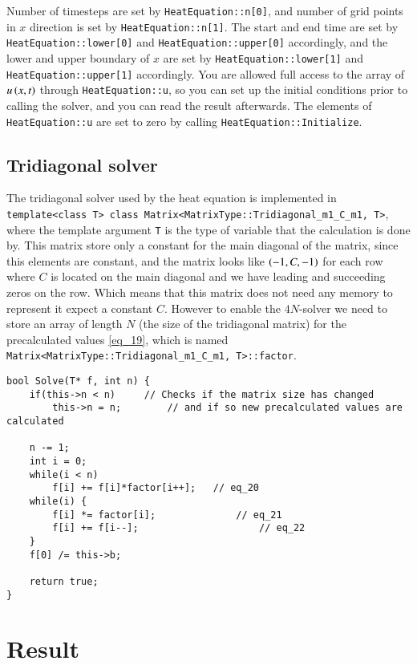 \documentclass[11pt,english,a4paper]{article}
\begin{document}
\begin{flushleft}
Number of timesteps are set by \texttt{HeatEquation::n[0]}, and number of grid points in $x$ direction is set by \texttt{HeatEquation::n[1]}. The start and end time are set by \texttt{HeatEquation::lower[0]} and \texttt{HeatEquation::upper[0]} accordingly, and the lower and upper boundary of $x$ are set by \texttt{HeatEquation::lower[1]} and \texttt{HeatEquation::upper[1]} accordingly. You are allowed full access to the array of $u\left({x,t}\right)$ through \texttt{HeatEquation::u}, so you can set up the initial conditions prior to calling the solver, and you can read the result afterwards. The elements of \texttt{HeatEquation::u}  are set to zero by calling \texttt{HeatEquation::Initialize}.

\subsection{Tridiagonal solver}

The tridiagonal solver used by the heat equation is implemented in \texttt{template<class T> class Matrix<MatrixType::Tridiagonal\_m1\_C\_m1, T>}, where the template argument \texttt{T} is the type of variable that the calculation is done by. This matrix store only a constant for the main diagonal of the matrix, since this elements are constant, and the matrix looks like $\left({-1,C,-1}\right)$ for each row where $C$ is located on the main diagonal and we have leading and succeeding zeros on the row. Which means that this matrix does not need any memory to represent it expect a constant $C$. However to enable the $4N$-solver we need to store an array of length $N$ (the size of the tridiagonal matrix) for the precalculated values \eqref{eq_19}, which is named \texttt{Matrix<MatrixType::Tridiagonal\_m1\_C\_m1, T>::factor}.

\begin{lstlisting}[title={\texttt{Matrix<MatrixType::Tridiagonal\_m1\_C\_m1, T>::Solve}}]
bool Solve(T* f, int n) {
	if(this->n < n)		// Checks if the matrix size has changed 
		this->n = n;		// and if so new precalculated values are calculated
	
	n -= 1;
	int i = 0;
	while(i < n)
		f[i] += f[i]*factor[i++];	// eq_20
	while(i) {
		f[i] *= factor[i];				// eq_21
		f[i] += f[i--];						// eq_22
	}
	f[0] /= this->b;
	
	return true;
}
\end{lstlisting}

\section{Result}


\end{flushleft}
\end{document}
